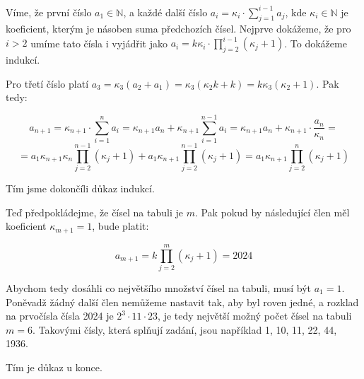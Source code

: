 \documentclass{fkssolpub}
\author{Ondřej Sedláček}
\begin{document}
Víme, že první číslo $a_1 \in \mathbb{N}$, a každé další číslo $a_i = \kappa_i \cdot \sum_{j = 1}^{i - 1} a_j$, kde $\kappa_i \in \mathbb{N}$ je koeficient, kterým je násoben suma předchozích čísel. Nejprve dokážeme, že pro $i > 2$ umíme tato čísla i vyjádřit jako $a_i = k \kappa_i \cdot \prod_{j = 2}^{i - 1} (\kappa_j + 1)$. To dokážeme indukcí.

Pro třetí číslo platí $a_3 = \kappa_3 (a_2 + a_1) = \kappa_3 (\kappa_2 k + k) = k \kappa_3 (\kappa_2 + 1)$. Pak tedy:

\[
	a_{n + 1} = \kappa_{n + 1} \cdot \sum_{i = 1}^{n} a_i = \kappa_{n + 1} a_{n} + \kappa_{n+1} \sum_{i = 1}^{n - 1} a_i = \kappa_{n + 1} a_{n} + \kappa_{n + 1} \cdot \frac{a_{n}}{\kappa_{n}} =
\]
\[
	= a_1 \kappa_{n + 1} \kappa_{n} \prod_{j = 2}^{n - 1} (\kappa_j + 1) + a_1 \kappa_{n + 1} \prod_{j = 2}^{n - 1} (\kappa_j + 1) = a_1 \kappa_{n + 1} \prod_{j = 2}^{n} (\kappa_j + 1)
\]

Tím jsme dokončíli důkaz indukcí.

Teď předpokládejme, že čísel na tabuli je $m$. Pak pokud by následující člen měl koeficient $\kappa_{m + 1} = 1$, bude platit:

\[
	a_{m + 1} = k \prod_{j = 2}^{m} (\kappa_j + 1) = 2024
\]

Abychom tedy dosáhli co největšího množství čísel na tabuli, musí být $a_1 = 1$. Poněvadž žádný další člen nemůžeme nastavit tak, aby byl roven jedné, a rozklad na prvočísla čísla 2024 je $2^3 \cdot 11 \cdot 23$, je tedy největší možný počet čísel na tabuli $m = 6$. Takovými čísly, která splňují zadání, jsou například 1, 10, 11, 22, 44, 1936.

Tím je důkaz u konce.
\end{document}
